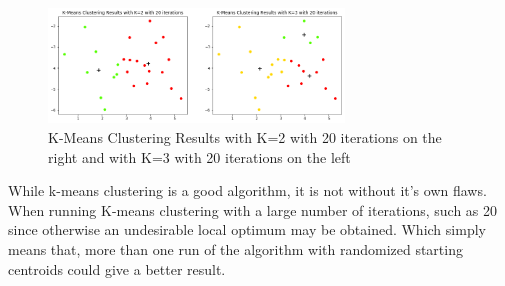 \begin{figure}[H]
	\centering
	\includegraphics[width=0.7\textwidth]{clusteringMethods/kmeansclustering/fig/k-mean.png}
	\caption{K-Means Clustering Results with K=2 with 20 iterations on the right and  with K=3 with 20 iterations on the left}
	\label{fig:kmeansclusteringk2_20Iteration}
\end{figure}

While k-means clustering is a good algorithm, it is not without it's own flaws. When running K-means clustering with a large number of iterations, such as 20 since otherwise an undesirable local optimum may be obtained. Which simply means that, more than one run of the algorithm with randomized starting centroids could give a better result.


